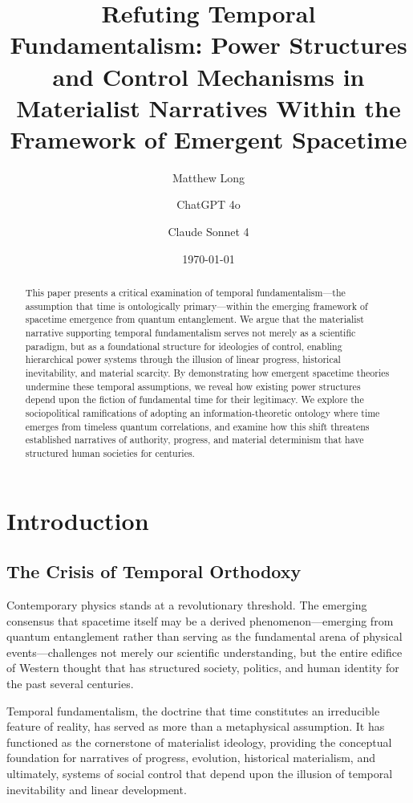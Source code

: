 \documentclass[12pt]{article}
\title{Refuting Temporal Fundamentalism: Power Structures and Control Mechanisms in Materialist Narratives Within the Framework of Emergent Spacetime}
\author[1]{Matthew Long}
\author[2]{ChatGPT 4o}
\author[3]{Claude Sonnet 4}
\affil[1]{Yoneda AI}
\affil[2]{OpenAI}
\affil[3]{Anthropic}
\date{\today}
\begin{document}
\maketitle

\begin{abstract}
This paper presents a critical examination of temporal fundamentalism—the assumption that time is ontologically primary—within the emerging framework of spacetime emergence from quantum entanglement. We argue that the materialist narrative supporting temporal fundamentalism serves not merely as a scientific paradigm, but as a foundational structure for ideologies of control, enabling hierarchical power systems through the illusion of linear progress, historical inevitability, and material scarcity. By demonstrating how emergent spacetime theories undermine these temporal assumptions, we reveal how existing power structures depend upon the fiction of fundamental time for their legitimacy. We explore the sociopolitical ramifications of adopting an information-theoretic ontology where time emerges from timeless quantum correlations, and examine how this shift threatens established narratives of authority, progress, and material determinism that have structured human societies for centuries.
\end{abstract}

\onehalfspacing

\tableofcontents

\newpage

\section{Introduction}

\subsection{The Crisis of Temporal Orthodoxy}

Contemporary physics stands at a revolutionary threshold. The emerging consensus that spacetime itself may be a derived phenomenon—emerging from quantum entanglement rather than serving as the fundamental arena of physical events—challenges not merely our scientific understanding, but the entire edifice of Western thought that has structured society, politics, and human identity for the past several centuries.

Temporal fundamentalism, the doctrine that time constitutes an irreducible feature of reality, has served as more than a metaphysical assumption. It has functioned as the cornerstone of materialist ideology, providing the conceptual foundation for narratives of progress, evolution, historical materialism, and ultimately, systems of social control that depend upon the illusion of temporal inevitability and linear development.
\end{document}
